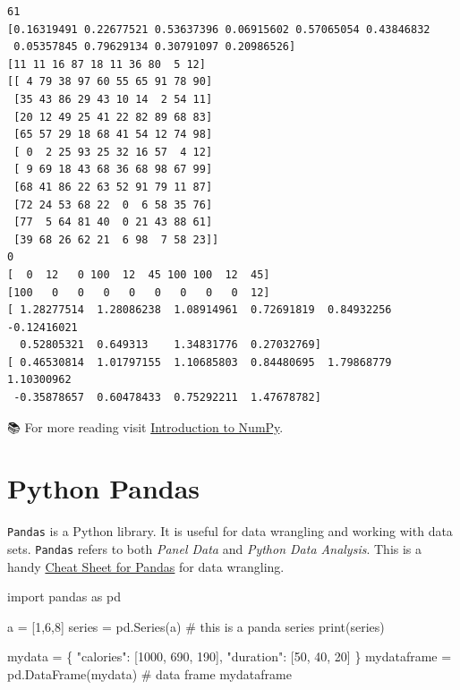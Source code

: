 \documentclass[
  letterpaper,
  DIV=11,
  numbers=noendperiod]{scrreprt}
\newenvironment{Shaded}{\begin{snugshade}}{\end{snugshade}}
\newcommand{\BuiltInTok}[1]{\textcolor[rgb]{0.00,0.23,0.31}{#1}}
\newcommand{\CommentTok}[1]{\textcolor[rgb]{0.37,0.37,0.37}{#1}}
\newcommand{\DecValTok}[1]{\textcolor[rgb]{0.68,0.00,0.00}{#1}}
\newcommand{\ImportTok}[1]{\textcolor[rgb]{0.00,0.46,0.62}{#1}}
\newcommand{\NormalTok}[1]{\textcolor[rgb]{0.00,0.23,0.31}{#1}}
\newcommand{\OperatorTok}[1]{\textcolor[rgb]{0.37,0.37,0.37}{#1}}
\newcommand{\StringTok}[1]{\textcolor[rgb]{0.13,0.47,0.30}{#1}}
\begin{document}
\begin{verbatim}
61
[0.16319491 0.22677521 0.53637396 0.06915602 0.57065054 0.43846832
 0.05357845 0.79629134 0.30791097 0.20986526]
[11 11 16 87 18 11 36 80  5 12]
[[ 4 79 38 97 60 55 65 91 78 90]
 [35 43 86 29 43 10 14  2 54 11]
 [20 12 49 25 41 22 82 89 68 83]
 [65 57 29 18 68 41 54 12 74 98]
 [ 0  2 25 93 25 32 16 57  4 12]
 [ 9 69 18 43 68 36 68 98 67 99]
 [68 41 86 22 63 52 91 79 11 87]
 [72 24 53 68 22  0  6 58 35 76]
 [77  5 64 81 40  0 21 43 88 61]
 [39 68 26 62 21  6 98  7 58 23]]
0
[  0  12   0 100  12  45 100 100  12  45]
[100   0   0   0   0   0   0   0   0  12]
[ 1.28277514  1.28086238  1.08914961  0.72691819  0.84932256 -0.12416021
  0.52805321  0.649313    1.34831776  0.27032769]
[ 0.46530814  1.01797155  1.10685803  0.84480695  1.79868779  1.10300962
 -0.35878657  0.60478433  0.75292211  1.47678782]
\end{verbatim}

📚 For more reading visit
\href{https://jakevdp.github.io/PythonDataScienceHandbook/02.00-introduction-to-numpy.html}{Introduction
to NumPy}.

\hypertarget{python-pandas}{%
\section*{Python Pandas}\label{python-pandas}}


\texttt{Pandas} is a Python library. It is useful for data wrangling and
working with data sets. \texttt{Pandas} refers to both \emph{Panel Data}
and \emph{Python Data Analysis}. This is a handy
\href{https://pandas.pydata.org/Pandas_Cheat_Sheet.pdf}{Cheat Sheet for
Pandas} for data wrangling.

\begin{Shaded}
\begin{Highlighting}[]
\ImportTok{import}\NormalTok{ pandas }\ImportTok{as}\NormalTok{ pd}

\NormalTok{a }\OperatorTok{=}\NormalTok{ [}\DecValTok{1}\NormalTok{,}\DecValTok{6}\NormalTok{,}\DecValTok{8}\NormalTok{]}
\NormalTok{series }\OperatorTok{=}\NormalTok{ pd.Series(a) }\CommentTok{\# this is a panda series}
\BuiltInTok{print}\NormalTok{(series)}

\NormalTok{mydata }\OperatorTok{=}\NormalTok{ \{}
  \StringTok{"calories"}\NormalTok{: [}\DecValTok{1000}\NormalTok{, }\DecValTok{690}\NormalTok{, }\DecValTok{190}\NormalTok{],}
  \StringTok{"duration"}\NormalTok{: [}\DecValTok{50}\NormalTok{, }\DecValTok{40}\NormalTok{, }\DecValTok{20}\NormalTok{]}
\NormalTok{\}}
\NormalTok{mydataframe }\OperatorTok{=}\NormalTok{ pd.DataFrame(mydata) }\CommentTok{\# data frame}
\NormalTok{mydataframe}
\end{Highlighting}
\end{Shaded}
\end{document}
